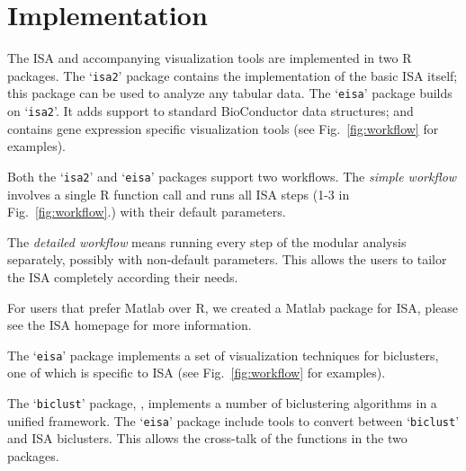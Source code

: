 \documentclass{bioinfo}
\newcommand{\Rpackage}[1]{`\texttt{#1}'}
\begin{document}
\section{Implementation}%
\label{sec:implementation}

The ISA and accompanying visualization tools are implemented in two R
packages. The \Rpackage{isa2} package contains the implementation of
the basic ISA itself; this package can be used to analyze any tabular
data. The \Rpackage{eisa} package builds on \Rpackage{isa2}. It adds
support to standard BioConductor data structures; and
contains gene expression specific visualization tools (see 
Fig.~\ref{fig:workflow} for examples).

Both the \Rpackage{isa2} and \Rpackage{eisa} packages support two
workflows. The \emph{simple workflow} involves a single R function
call and runs all ISA steps (1-3 in Fig.~\ref{fig:workflow}.) with
their default parameters.

The \emph{detailed workflow} means running every step of the modular
analysis separately, possibly with non-default parameters. This allows
the users to tailor the ISA completely according their needs.

For users that prefer Matlab over R, we created a Matlab package for
ISA, please see the ISA homepage for more information.


The \Rpackage{eisa} package implements a set of visualization
techniques for biclusters, one of which is specific to ISA (see
Fig.~\ref{fig:workflow} for examples). 



The \Rpackage{biclust} package, \citep{biclust}, implements a number of
biclustering algorithms in a unified framework. The \Rpackage{eisa}
package include tools to convert between \Rpackage{biclust} and ISA
biclusters. This allows the cross-talk of the functions in the two
packages.
\end{document}
